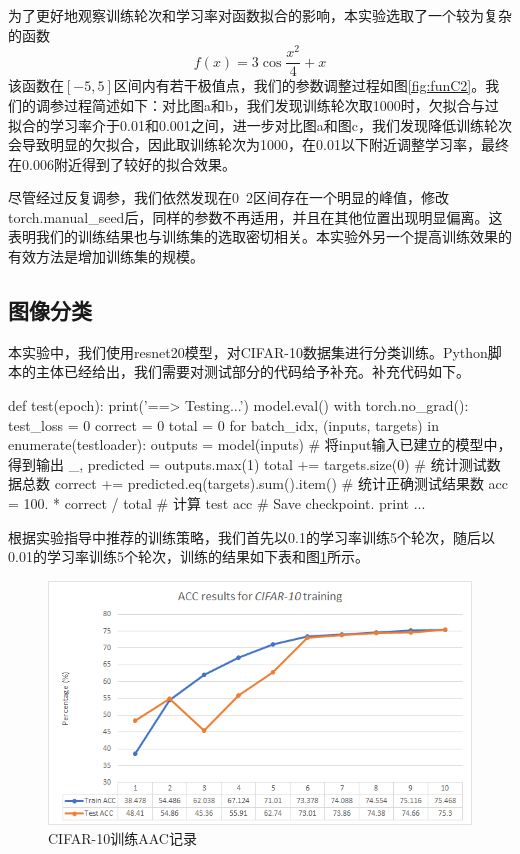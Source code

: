 \documentclass{article}
\begin{document}
为了更好地观察训练轮次和学习率对函数拟合的影响，本实验选取了一个较为复杂的函数 $$ f(x) = 3 \cos{\frac{x^2}{4}} +  x $$ 该函数在$[-5,5]$区间内有若干极值点，我们的参数调整过程如图\ref{fig:funC2}。我们的调参过程简述如下：对比图a和b，我们发现训练轮次取1000时，欠拟合与过拟合的学习率介于0.01和0.001之间，进一步对比图a和图c，我们发现降低训练轮次会导致明显的欠拟合，因此取训练轮次为1000，在0.01以下附近调整学习率，最终在0.006附近得到了较好的拟合效果。

尽管经过反复调参，我们依然发现在0~2区间存在一个明显的峰值，修改torch.manual\_seed后，同样的参数不再适用，并且在其他位置出现明显偏离。这表明我们的训练结果也与训练集的选取密切相关。本实验外另一个提高训练效果的有效方法是增加训练集的规模。

\subsection{图像分类}

本实验中，我们使用resnet20模型，对CIFAR-10数据集进行分类训练。Python脚本的主体已经给出，我们需要对测试部分的代码给予补充。补充代码如下。

\begin{python}
def test(epoch):
    print('==> Testing...')
    model.eval()
    with torch.no_grad():
        test_loss = 0
        correct = 0
        total = 0
        for batch_idx, (inputs, targets) in enumerate(testloader):
            outputs = model(inputs)              # 将input输入已建立的模型中，得到输出
            _, predicted = outputs.max(1)
            total += targets.size(0)             # 统计测试数据总数
            correct += predicted.eq(targets).sum().item()  # 统计正确测试结果数
        acc = 100. * correct / total             # 计算 test acc
    # Save checkpoint.
    print ...
\end{python}

根据实验指导中推荐的训练策略，我们首先以0.1的学习率训练5个轮次，随后以0.01的学习率训练5个轮次，训练的结果如下表和图\ref{fig:img}所示。

\begin{figure}[htb]
\centering
\includegraphics[width=13.5cm]{img/img.png}
\caption{CIFAR-10训练AAC记录}
\label{fig:img}
\end{figure}
\end{document}
